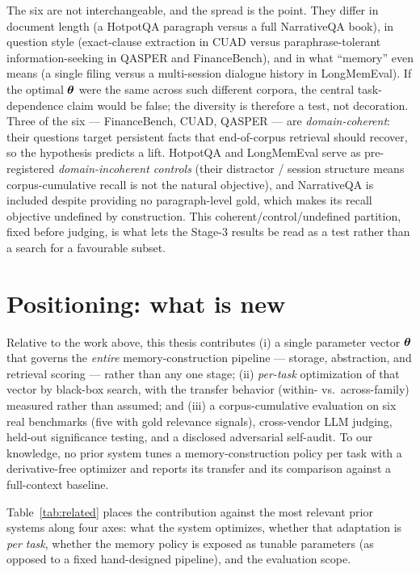 The six are not interchangeable, and the spread is the point. They differ in
document length (a HotpotQA paragraph versus a full NarrativeQA book), in question
style (exact-clause extraction in CUAD versus paraphrase-tolerant
information-seeking in QASPER and FinanceBench), and in what ``memory'' even means (a single filing
versus a multi-session dialogue history in LongMemEval). If the optimal
$\boldsymbol{\theta}$ were the same across such different corpora, the central
task-dependence claim would be false; the diversity is therefore a test, not
decoration. Three of the six --- FinanceBench, CUAD, QASPER --- are
\emph{domain-coherent}: their questions target persistent facts that
end-of-corpus retrieval should recover, so the hypothesis predicts a lift.
HotpotQA and LongMemEval serve as pre-registered \emph{domain-incoherent
controls} (their distractor / session structure means corpus-cumulative recall is
not the natural objective), and NarrativeQA is included despite providing no
paragraph-level gold, which makes its recall objective undefined by construction.
This coherent/control/undefined partition, fixed before judging, is what lets the
Stage-3 results be read as a test rather than a search for a favourable subset.

\section{Positioning: what is new}
\label{sec:gap}
Relative to the work above, this thesis contributes (i) a single parameter
vector $\boldsymbol{\theta}$ that governs the \emph{entire} memory-construction pipeline
--- storage, abstraction, and retrieval scoring --- rather than any one stage;
(ii) \emph{per-task} optimization of that vector by black-box search, with the
transfer behavior (within- vs.\ across-family) measured rather than assumed;
and (iii) a corpus-cumulative evaluation on six real benchmarks (five with gold
relevance signals), cross-vendor LLM judging, held-out significance testing, and a
disclosed adversarial self-audit. To our knowledge, no prior system tunes a
memory-construction policy per task with a derivative-free optimizer and reports
its transfer and its comparison against a full-context baseline.

Table~\ref{tab:related} places the contribution against the most relevant prior
systems along four axes: what the system optimizes, whether that adaptation is
\emph{per task}, whether the memory policy is exposed as tunable parameters (as
opposed to a fixed hand-designed pipeline), and the evaluation scope.

